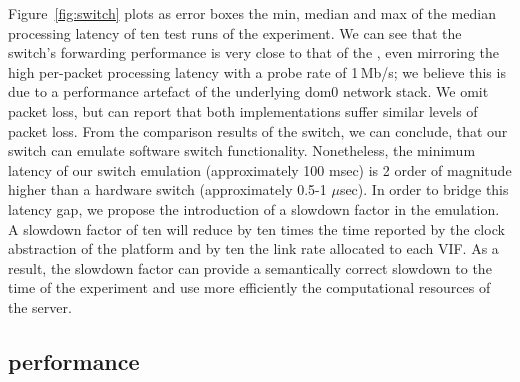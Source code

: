 Figure~\ref{fig:switch} plots as error boxes the min, median and max of the
median processing latency of ten test runs of the experiment. We can see that
the \mirage switch's forwarding performance is very close to that of the
\ovs, even mirroring the high per-packet processing latency with a probe
rate of 1\,Mb/s; we believe this is due to a performance artefact of the
underlying dom0 network stack. We omit packet loss,
but can report that both implementations suffer similar levels of packet loss.
From the comparison results of the \mirage \of switch, we can conclude, that our
\of switch can emulate software switch functionality. Nonetheless, the minimum
latency of our switch emulation (approximately 100 msec) is 2 order of magnitude higher than a
hardware switch (approximately 0.5-1 $\mu$sec). In order to bridge this latency
gap, we propose the introduction of a slowdown factor in the emulation. 
A slowdown factor of ten will reduce by ten times the time reported by 
the clock abstraction of the \mirage platform and by ten the link rate allocated
to each VIF. As a result, the slowdown factor can provide a semantically correct
slowdown to the time of the experiment and use more efficiently the
computational resources of the server. 

\subsection{ performance} \label{sec:sdnsim-ns3-perf}


